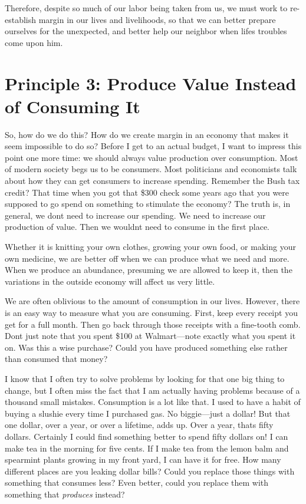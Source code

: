 Therefore, despite so much of our labor being taken from us, we must
work to re-establish margin in our lives and livelihoods, so that we
can better prepare ourselves for the unexpected, and better help our
neighbor when life{\textquotesingle}s troubles come upon him.

\section{Principle 3: Produce Value Instead of Consuming It}

So, how do we do this?
How do we create margin in an economy that makes it seem impossible to
do so? Before I get to an actual budget, I want to impress this point
one more time: we should always value production over consumption.
Most of modern society
begs us to be
consumers. Most politicians and economists talk about how they can get
consumers to increase spending.
Remember the Bush tax
credit?  That time when you got that \$300 check some years ago that
you were supposed to go spend on something to stimulate the economy?
 The truth is, in
general, we don{\textquotesingle}t need to increase our spending. We
need to increase our production of value. Then we
wouldn{\textquotesingle}t need to consume in the first place.

Whether it is knitting your own clothes, growing your own food, or
making your own medicine, we are better off when we can produce what we
need and more. When we produce an abundance, presuming we are allowed
to keep it, then the variations in the outside economy will affect us
very little. 

We are often oblivious to the amount of consumption in our lives.
However, there is an easy way to measure what you are consuming. First,
keep every receipt you get for a full month. Then go back through those
receipts with a fine-tooth comb. Don{\textquotesingle}t just note that
you spent \$100 at Walmart—note exactly what you spent it on. Was this
a wise purchase? Could you have produced something else rather than
consumed that money?  

I know that I often try to solve problems by looking for that one big
thing to change, but I often miss the fact that I am actually having
problems because of a thousand small mistakes. Consumption is a lot
like that. I used to have a habit of buying a slushie every time I
purchased gas. No biggie—just a dollar!  But that one dollar, over a
year, or over a lifetime, adds up. Over a year, that{\textquotesingle}s
fifty dollars. Certainly I could find something better to spend fifty
dollars on!  I can make tea in the morning for five cents. If I make
tea from the lemon balm and spearmint plants growing in my front yard,
I can have it for free. How many different places are you leaking
dollar bills?  Could
you replace those
things with something that consumes less?  Even better, could you
replace them with
something that \textit{produces} instead?

